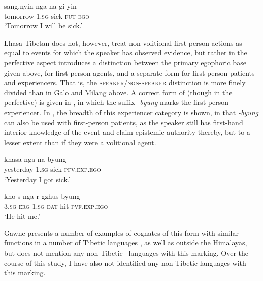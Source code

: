 \begin{exe}
        \ex \label{e:Description:LhasaVolition}
        \gll * sang.nyin nga na-gi-yin \\
        {} tomorrow \textsc{1.sg} sick-\textsc{fut}-\textsc{ego} \\
        \glt `Tomorrow I will be sick.' \cite[Lhasa Tibetan,][164]{Garrett2001}
\end{exe}

Lhasa Tibetan does not, however, treat non-volitional first-person actions as equal to events for which the speaker has observed evidence, but rather in the perfective aspect introduces a distinction between the primary egophoric base given above, for first-person agents, and a separate form for first-person patients and experiencers. That is, the \textsc{speaker}/\textsc{non-speaker} distinction is more finely divided than in Galo and Milang above. A correct form of  (though in the perfective) is given in , in which the suffix \textit{-byung} marks the first-person experiencer. In , the breadth of this experiencer category is shown, in that \textit{-byung} can also be used with first-person patients, as the speaker still has first-hand interior knowledge of the event and claim epistemic authority thereby, but to a lesser extent than if they were a volitional agent.

\begin{exe}
        \ex
        \begin{xlist}
                \ex\label{e:Description:LhasaEgoErgExperiencer}
                \gll khasa nga na-byung \\
                yesterday \textsc{1.sg} sick-\textsc{pfv.exp.ego} \\
                \glt `Yesterday I got sick.' \cite[Lhasa Tibetan,][169]{Garrett2001}

                \ex\label{e:Description:LhasaEgoAbsExperiencer}
                \gll kho-s nga-r gzhus-byung \\
                \textsc{3.sg-erg} \textsc{1.sg-dat} hit-\textsc{pvf.exp.ego} \\
                \glt `He hit me.' \cite[Lhasa Tibetan,][395]{DeLancey2017Tibetan}
        \end{xlist}
\end{exe}

Gawne presents a number of examples of cognates of this form with similar functions  in a number of Tibetic languages , as well as outside the Himalayas, but does not mention any non-Tibetic \lfam\ languages with this marking. Over the course of this study, I have also not identified any non-Tibetic languages with this marking.

